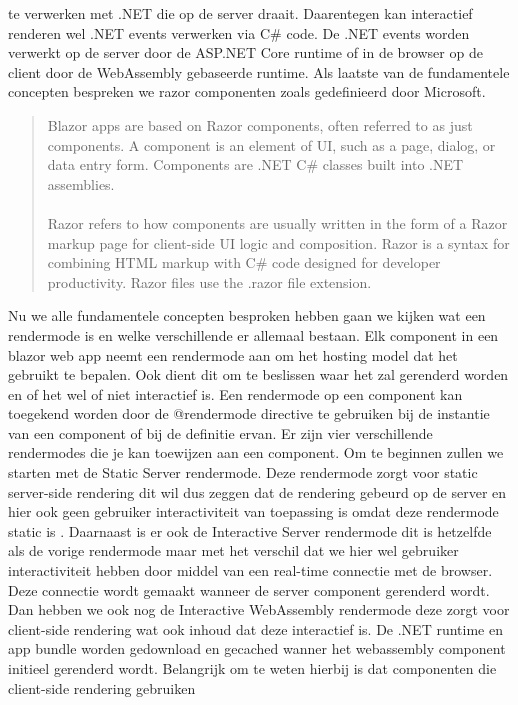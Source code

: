 \documentclass{hogent-article}
\begin{document}
te verwerken met .NET die op de server draait. \autocite{Guardrex2023} Daarentegen kan interactief renderen wel .NET events verwerken via C\# code. De .NET events worden verwerkt op de server door de ASP.NET Core
runtime of in de browser op de client door de WebAssembly gebaseerde runtime. \autocite{Guardrex2023} Als laatste van de fundamentele concepten bespreken we razor componenten zoals gedefinieerd door Microsoft.
\begin{quote}
  Blazor apps are based on Razor components, often referred to as just components. A component is an element of UI, such as a page, dialog, or data entry form. Components are .NET C\# classes built into .NET assemblies.
  \paragraph{}
  Razor refers to how components are usually written in the form of a Razor markup page for client-side UI logic and composition. Razor is a syntax for combining HTML markup with C\# code designed for developer productivity. Razor files use the .razor file extension. \autocite{Guardrex2023}
\end{quote}
Nu we alle fundamentele concepten besproken hebben gaan we kijken wat een rendermode is en welke verschillende er allemaal bestaan. Elk component in een blazor web app neemt een rendermode aan om het hosting model
dat het gebruikt te bepalen. Ook dient dit om te beslissen waar het zal gerenderd worden en of het wel of niet interactief is. \autocite{Guardrex2023a} Een rendermode op een component kan toegekend worden door de
@rendermode directive te gebruiken bij de instantie van een component of bij de definitie ervan. \autocite{Guardrex2023a} Er zijn vier verschillende rendermodes die je kan toewijzen aan een component. Om te beginnen zullen we starten met de
Static Server rendermode. Deze rendermode zorgt voor static server-side rendering dit wil dus zeggen dat de rendering gebeurd op de server en hier ook geen gebruiker interactiviteit van toepassing is omdat deze rendermode
static is \autocite{Guardrex2023a}. Daarnaast is er ook de Interactive Server rendermode dit is hetzelfde als de vorige rendermode maar met het verschil dat we hier wel gebruiker interactiviteit hebben door middel van een real-time connectie
met de browser. Deze connectie wordt gemaakt wanneer de server component gerenderd wordt. \autocite{Guardrex2023a} Dan hebben we ook nog de Interactive WebAssembly rendermode deze zorgt voor client-side rendering wat ook inhoud dat deze
interactief is. De .NET runtime en app bundle worden gedownload en gecached wanner het webassembly component initieel gerenderd wordt. Belangrijk om te weten hierbij is dat componenten die client-side rendering gebruiken
\end{document}
